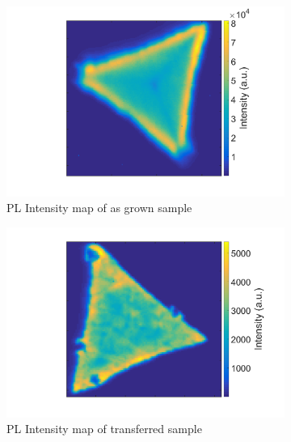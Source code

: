 \begin{figure}[H] %
	\begin{center}
		\begin{subfigure}[b]{0.4\textwidth}
			\includegraphics[scale=0.15]{Transfer/TransferPLIntensityMapAsgrown.png}
			\caption{PL Intensity map of as grown sample}
			\label{fig:TransferPLIntensityMapAsgrown}
		\end{subfigure}
		\quad
		\begin{subfigure}[b]{0.4\textwidth}
			\includegraphics[scale=0.15]{Transfer/TransferPLIntensityMapTransferred.png}
			\caption{PL Intensity map of transferred sample}
			\label{fig:TransferPLIntensityMapTransferred}
		\end{subfigure}
		\vfill
		\begin{subfigure}[b]{0.4\textwidth}

\end{subfigure}
\end{center}
\end{figure}
